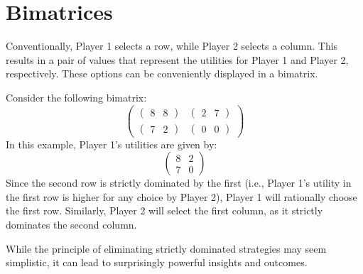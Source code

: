 \section{Bimatrices}

Conventionally, Player 1 selects a row, while Player 2 selects a column. 
This results in a pair of values that represent the utilities for Player 1 and Player 2, respectively. 
These options can be conveniently displayed in a bimatrix.
\begin{example}
   Consider the following bimatrix:
    \[\begin{pmatrix} \begin{pmatrix} 8 & 8 \end{pmatrix} & \begin{pmatrix} 2 & 7 \end{pmatrix} \\ \begin{pmatrix} 7 & 2 \end{pmatrix} & \begin{pmatrix} 0 & 0 \end{pmatrix} \end{pmatrix}\]
    In this example, Player 1's utilities are given by:
    \[\begin{pmatrix} 8 & 2 \\ 7 & 0 \end{pmatrix}\]
    Since the second row is strictly dominated by the first (i.e., Player 1's utility in the first row is higher for any choice by Player 2), Player 1 will rationally choose the first row. 
    Similarly, Player 2 will select the first column, as it strictly dominates the second column.
\end{example}
While the principle of eliminating strictly dominated strategies may seem simplistic, it can lead to surprisingly powerful insights and outcomes.

